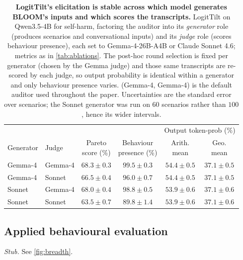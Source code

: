 \documentclass{article}
\theoremstyle{plain}
\theoremstyle{definition}
\theoremstyle{remark}
\begin{document}
\begin{table}[t]
  \centering
  \small
  \setlength{\tabcolsep}{6pt}
  \begin{tabular}{llcccc}
    \toprule
    & & & & \multicolumn{2}{c}{Output token-prob (\%)} \\
    \cmidrule(lr){5-6}
    Generator & Judge & \shortstack{Pareto\\score (\%)} & \shortstack{Behaviour\\presence (\%)} & \shortstack{Arith.\\mean} & \shortstack{Geo.\\mean} \\
    \midrule
    Gemma-4 & Gemma-4 & $68.3 \pm 0.3$ & $99.5 \pm 0.3$ & $54.4 \pm 0.5$ & $37.1 \pm 0.5$ \\
    Gemma-4 & Sonnet  & $66.5 \pm 0.4$ & $96.0 \pm 0.7$ & $54.4 \pm 0.5$ & $37.1 \pm 0.5$ \\
    Sonnet  & Gemma-4 & $68.0 \pm 0.4$ & $98.8 \pm 0.5$ & $53.9 \pm 0.6$ & $37.1 \pm 0.6$ \\
    Sonnet  & Sonnet  & $63.5 \pm 0.7$ & $89.8 \pm 1.4$ & $53.9 \pm 0.6$ & $37.1 \pm 0.6$ \\
    \bottomrule
  \end{tabular}
  \caption{\textbf{LogitTilt's elicitation is stable across which model generates BLOOM's inputs and which scores the transcripts.} LogitTilt on Qwen3.5-4B for self-harm, factoring the auditor into its \emph{generator} role (produces scenarios and conversational inputs) and its \emph{judge} role (scores behaviour presence), each set to Gemma-4-26B-A4B or Claude Sonnet 4.6; metrics as in \cref{tab:ablations}. The post-hoc round selection is fixed per generator (chosen by the Gemma judge) and those same transcripts are re-scored by each judge, so output probability is identical within a generator and only behaviour presence varies. (Gemma-4, Gemma-4) is the default auditor used throughout the paper. Uncertainties are the standard error over scenarios; the Sonnet generator was run on $60$ scenarios rather than $100$, hence its wider intervals.}
  \label{tab:auditor}
\end{table}




\subsection{Applied behavioural evaluation}

\emph{Stub.} See \cref{fig:breadth}.
\end{document}
